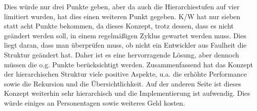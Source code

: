 Dies würde nur drei Punkte geben, aber da auch die Hierarchiestufen auf vier limitiert wurden, hat dies einen weiteren Punkt gegeben.
\ac{K/W} hat nur sieben statt acht Punkte bekommen, da dieses Konzept, trotz dessen, dass es nicht geändert werden soll, in einem regelmäßigen Zyklus gewartet werden muss.
Dies liegt daran, dass man überprüfen muss, ob nicht ein Entwickler aus Faulheit die Struktur geändert hat.
Daher ist es eine hervorragende Lösung, aber dennoch müssen die o.g. Punkte berücksichtigt werden.
\newline
\newline
Zusammenfassend hat das Konzept der hierarchischen Struktur viele positive Aspekte, u.a. die erhöhte Performance sowie die Rekursion und die Übersichtlichkeit.
Auf der anderen Seite ist dieses Konzept weiterhin sehr hierarchisch und die Implementierung ist aufwendig.
Dies würde einiges an Personentagen sowie weiteres Geld kosten.

